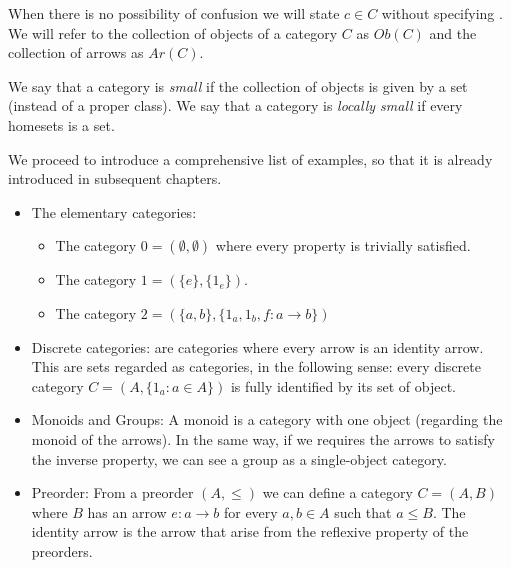 When there is no possibility of confusion we will state $c\in C$ without specifying . We will refer to the collection of objects of a category $C$ as $Ob(C)$ and the collection of arrows as $Ar(C)$. 

\begin{definition}
  We say that a category is \emph{small} if the collection of objects is given by a set (instead of a proper class). We say that a category is \emph{locally small} if every homesets is a set.
\end{definition}

We proceed to introduce a comprehensive list of examples, so that it is already introduced in subsequent chapters. 
\begin{example}

  \begin{itemize}  \ 
\item The elementary categories:
  \begin{itemize}
  \item The category $0 = ( \emptyset, \emptyset)$ where every property is trivially satisfied.
  \item The category $1 = (\{e\},\{1_e\})$.
  \item The category $2 = (\{a,b\},\{1_a,1_b,f:a\to b\})$\label{2-category}
  \end{itemize}

\item Discrete categories: are categories where every arrow is an identity arrow. This are sets regarded as categories, in the following sense: every discrete category $C=(A, \{1_a : a \in A\})$ is fully identified by its set of object.  
\item Monoids and Groups: A monoid is a category with one object (regarding the monoid of the arrows). In the same way, if we requires the arrows to satisfy the inverse property, we can see a group as a single-object category. 
\item Preorder: From a preorder $(A, \le)$ we can define a category $C = (A, B)$ where $B$ has an arrow $e: a \to b$ for every $a,b\in A$ such that $a \le B$. The identity arrow is the arrow that arise from the reflexive property of the preorders. 


\end{itemize}
\end{example}
